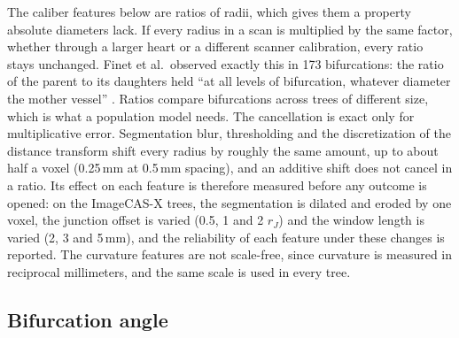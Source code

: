 The caliber features below are ratios of radii, which gives them a property absolute diameters lack.
If every radius in a scan is multiplied by the same factor, whether through a larger heart or a different scanner calibration, every ratio stays unchanged.
Finet et al.\ observed exactly this in 173 bifurcations: the ratio of the parent to its daughters held ``at all levels of bifurcation, whatever diameter the mother vessel'' \cite{finet2008fractal}.
Ratios compare bifurcations across trees of different size, which is what a population model needs.
The cancellation is exact only for multiplicative error.
Segmentation blur, thresholding and the discretization of the distance transform shift every radius by roughly the same amount, up to about half a voxel (0.25\,mm at 0.5\,mm spacing), and an additive shift does not cancel in a ratio.
Its effect on each feature is therefore measured before any outcome is opened: on the ImageCAS-X trees, the segmentation is dilated and eroded by one voxel, the junction offset is varied (0.5, 1 and 2 $r_J$) and the window length is varied (2, 3 and 5\,mm), and the reliability of each feature under these changes is reported.
The curvature features are not scale-free, since curvature is measured in reciprocal millimeters, and the same scale is used in every tree.

\subsection{Bifurcation angle}

